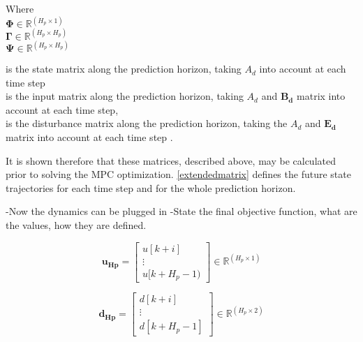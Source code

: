 
\begin{minipage}[t]{0.20\textwidth}
Where\\
\hspace*{8mm} $\bm{\Phi} \in \mathbb{R}^{(H_p \times 1)}$ \\
\hspace*{8mm} $\bm{\Gamma} \in \pmb{\mathbb{R}}^{(H_p \times H_p)}$ \\
\hspace*{8mm} $\bm{\Psi} \in \pmb{\mathbb{R}}^{(H_p \times H_p)}$ 
\end{minipage}
\begin{minipage}[t]{0.68\textwidth}
\vspace*{2mm}
is the state matrix along the prediction horizon, taking $A_d$ into account at each time step \\
is the input matrix along the prediction horizon, taking $A_d$ and $\bm{B_d}$ matrix into account at each time step, \\
is the disturbance matrix along the prediction horizon, taking the $A_d$ and $\bm{E_d}$ matrix into account at each time step . \\ 
\end{minipage}

It is shown therefore that these matrices, described above, may be calculated prior to solving the MPC optimization. \eqref{extendedmatrix} defines the future state trajectories for each time step and for the whole prediction horizon.



-Now the dynamics can be plugged in
-State the final objective function, what are the values, how they are defined. 


\begin{equation}
\pmb{u_{Hp}} =  
 \begin{bmatrix}
  u[k+i]\\
  \vdots  \\
  u[k+H_p-1)   
 \end{bmatrix}
 \in \pmb{\mathbb{R}}^{(H_p \times 1)}
\end{equation}


\begin{equation}
\pmb{d_{Hp}} =  
 \begin{bmatrix}
  d[k+i]\\
  \vdots  \\
  d[k+H_p-1]   
 \end{bmatrix}
 \in \pmb{\mathbb{R}}^{(H_p \times 2)}
\end{equation}



